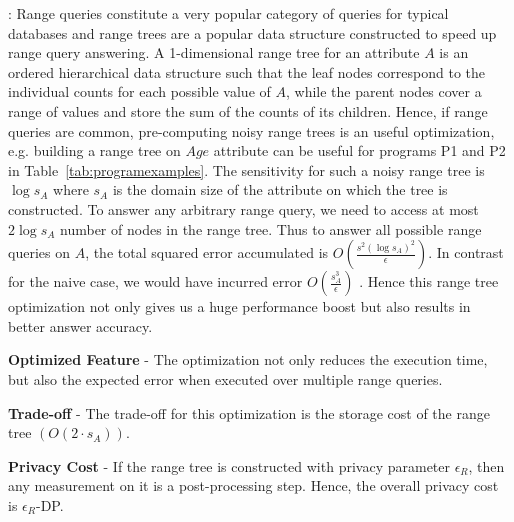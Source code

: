 :
Range queries constitute a very popular category of queries for typical databases and range trees are a popular data structure constructed to speed up range query answering. 
A 1-dimensional range tree for an attribute $A$ is an ordered hierarchical data structure such that the leaf nodes correspond to the individual counts for each possible value of $A$, while the parent nodes cover a range of values and store the sum of the counts of its children. Hence, if range queries are common, pre-computing noisy range trees is an useful optimization, e.g. building a range tree on $Age$ attribute can be useful for programs P1 and P2 in Table~\ref{tab:programexamples}. The sensitivity for  such a noisy range tree is $\log s_A$ where $s_A$ is the domain size of the attribute on which the tree is constructed. To answer any arbitrary range query, we need to access at most $2\log s_A$ number of nodes in the range tree. Thus to answer all possible range queries on $A$, the total squared error accumulated is $O(\frac{s^2(\log s_A)^2 }{\epsilon})$. In contrast for the naive case, we would have incurred error $O(\frac{s_A^3}{\epsilon})$ \cite{cdf}. Hence this range tree optimization not only gives us a huge performance boost but also results in better answer accuracy.





\squishlist
\item \textbf{Optimized Feature} - The optimization not only reduces the execution time, but also the expected error when executed over multiple range queries.
\item \textbf{Trade-off} - The trade-off for this optimization is the storage cost of the range tree $(O(2\cdot s_A))$.
\item \textbf{Privacy Cost} - If the range tree is constructed  with privacy parameter $\epsilon_R$, then any measurement on it is a post-processing step. Hence, the overall privacy cost is $\epsilon_R$-DP.
\squishend

